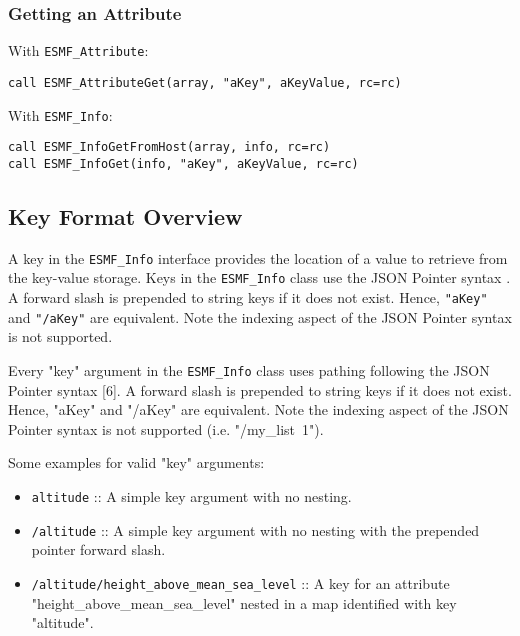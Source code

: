 \subsubsection{Getting an Attribute}
With \texttt{ESMF\_Attribute}:
\begin{verbatim}
call ESMF_AttributeGet(array, "aKey", aKeyValue, rc=rc)
\end{verbatim}
With \texttt{ESMF\_Info}:
\begin{verbatim}
call ESMF_InfoGetFromHost(array, info, rc=rc)
call ESMF_InfoGet(info, "aKey", aKeyValue, rc=rc)
\end{verbatim}

\subsection{Key Format Overview}
\label{info_key_format}
A key in the \texttt{ESMF\_Info} interface provides the location of a value to retrieve from the key-value storage. Keys in the \texttt{ESMF\_Info} class use the JSON Pointer syntax \cite{json_for_modern_cpp_json_pointer}. A forward slash is prepended to string keys if it does not exist. Hence, \texttt{"aKey"} and \texttt{"/aKey"} are equivalent. Note the indexing aspect of the JSON Pointer syntax is not supported.

Every "key" argument in the \texttt{ESMF\_Info} class uses pathing following the JSON Pointer syntax [6]. A forward slash is prepended to string keys if it does not exist. Hence, "aKey" and "/aKey" are equivalent. Note the indexing aspect of the JSON Pointer syntax is not supported (i.e. "/my\_list~1").

Some examples for valid "key" arguments:
\begin{itemize}
    \item \texttt{altitude} :: A simple key argument with no nesting.
    \item \texttt{/altitude} :: A simple key argument with no nesting with the prepended pointer forward slash.
    \item \texttt{/altitude/height\_above\_mean\_sea\_level} :: A key for an attribute "height\_above\_mean\_sea\_level" nested in a map identified with key "altitude".
\end{itemize}